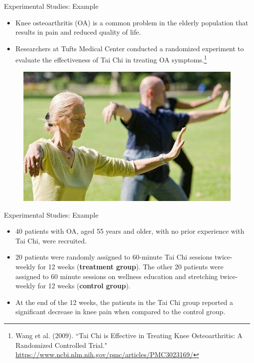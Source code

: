 \documentclass[10pt]{beamer}
\begin{document}
\begin{frame}{Experimental Studies: Example}
\begin{itemize}
\item Knee osteoarthritis (OA) is a common problem in the elderly population that results in pain and reduced quality of life.  
\vspace{5pt}
\item Researchers at Tufts Medical Center conducted a randomized experiment to evaluate the effectiveness of Tai Chi in treating OA symptoms.\footnote{\scriptsize Wang et al. (2009). ``Tai Chi is Effective in Treating Knee Osteoarthritis: A Randomized Controlled Trial." \url{https://www.ncbi.nlm.nih.gov/pmc/articles/PMC3023169/}}
\end{itemize}
\begin{figure}
\flushright
\includegraphics[scale=0.3]{figure/taiChi.jpg}
\end{figure}
\end{frame}

\begin{frame}{Experimental Studies: Example}
\vspace{-2cm} 
\begin{itemize}
\item 40 patients with OA, aged 55 years and older, with no prior experience with Tai Chi, were recruited.
\vspace{5pt}
\item 20 patients were randomly assigned to 60-minute Tai Chi sessions twice-weekly for 12 weeks (\textbf{treatment group}).  The other 20 patients were assigned to 60 minute sessions on wellness education and stretching twice-weekly for 12 weeks (\textbf{control group}).
\vspace{5pt}
\item At the end of the 12 weeks, the patients in the Tai Chi group reported a significant decrease in knee pain when compared to the control group.
\end{itemize}
\end{frame}
\end{document}
